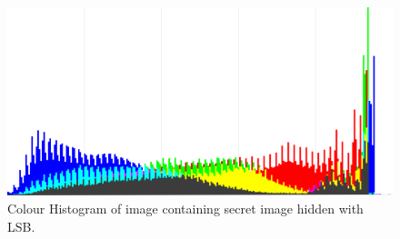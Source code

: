 \begin{figure}
	\centering
	\includegraphics[width=1\textwidth]{figures/HistoLSBCatEncrypted.png}
	\caption{Colour Histogram of image containing secret image hidden with LSB.}
	\label{fig:HistoWithLSB}
\end{figure}
